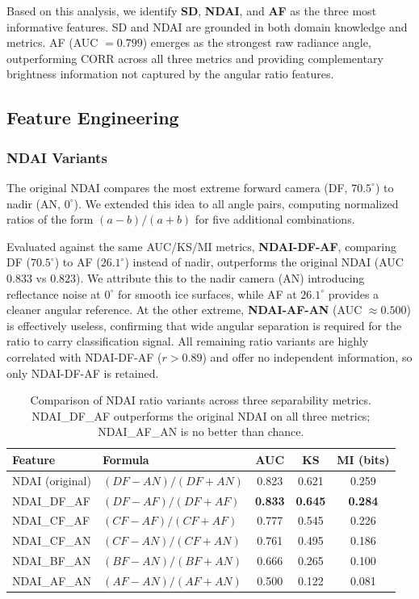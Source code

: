 \documentclass[10pt,letterpaper]{article}
\begin{document}
Based on this analysis, we identify \textbf{SD}, \textbf{NDAI}, and \textbf{AF} as the three most informative features. SD and NDAI are grounded in both domain knowledge and metrics. AF (AUC $= 0.799$) emerges as the strongest raw radiance angle, outperforming CORR across all three metrics and providing complementary brightness information not captured by the angular ratio features.

\subsection{Feature Engineering}

\subsubsection*{NDAI Variants}

The original NDAI compares the most extreme forward camera (DF, $70.5^\circ$) to nadir (AN, $0^\circ$). We extended this idea to all angle pairs, computing normalized ratios of the form $(a - b)/(a + b)$ for five additional combinations. 

Evaluated against the same AUC/KS/MI metrics, \textbf{NDAI-DF-AF}, comparing DF ($70.5^\circ$) to AF ($26.1^\circ$) instead of nadir, outperforms the original NDAI (AUC $0.833$ vs $0.823$). We attribute this to the nadir camera (AN) introducing reflectance noise at $0^\circ$ for smooth ice surfaces, while AF at $26.1^\circ$ provides a cleaner angular reference. At the other extreme, \textbf{NDAI-AF-AN} (AUC $\approx 0.500$) is effectively useless, confirming that wide angular separation is required for the ratio to carry classification signal. All remaining ratio variants are highly correlated with NDAI-DF-AF ($r > 0.89$) and offer no independent information, so only NDAI-DF-AF is retained.


\begin{table}[H]
\centering
\begin{tabular}{llccc}
\hline
\textbf{Feature} & \textbf{Formula} & \textbf{AUC} & \textbf{KS} & \textbf{MI (bits)} \\
\hline
NDAI (original) & $(DF - AN)/(DF + AN)$ & 0.823 & 0.621 & 0.259 \\
NDAI\_DF\_AF    & $(DF - AF)/(DF + AF)$ & \textbf{0.833} & \textbf{0.645} & \textbf{0.284} \\
NDAI\_CF\_AF    & $(CF - AF)/(CF + AF)$ & 0.777 & 0.545 & 0.226 \\
NDAI\_CF\_AN    & $(CF - AN)/(CF + AN)$ & 0.761 & 0.495 & 0.186 \\
NDAI\_BF\_AN    & $(BF - AN)/(BF + AN)$ & 0.666 & 0.265 & 0.100 \\
NDAI\_AF\_AN    & $(AF - AN)/(AF + AN)$ & 0.500 & 0.122 & 0.081 \\
\hline
\end{tabular}
\caption{Comparison of NDAI ratio variants across three separability metrics. NDAI\_DF\_AF outperforms the original NDAI on all three metrics; NDAI\_AF\_AN is no better than chance.}
\label{tab:ndai_variants}
\end{table}
\end{document}
